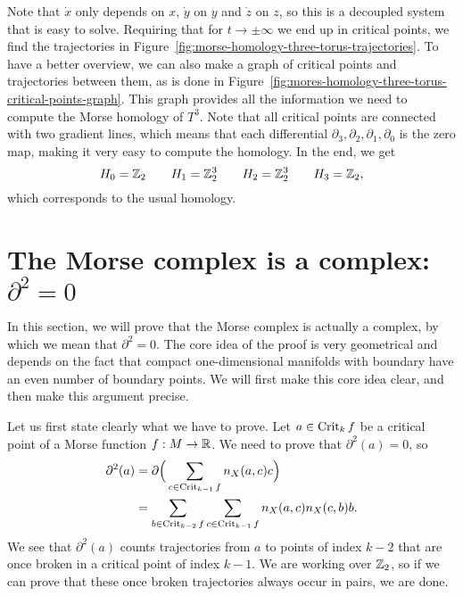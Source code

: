 \begin{eg}
    Note that $\dot x$ only depends on  $x$,  $\dot y$ on  $y$ and  $\dot z$ on $z$, so this is a decoupled system that is easy to solve.
    Requiring that for $t \to  \pm\infty$ we end up in critical points, we find the trajectories in Figure~\ref{fig:morse-homology-three-torus-trajectories}.
    To have a better overview, we can also make a graph of critical points and trajectories between them, as is done in Figure~\ref{fig:mores-homology-three-torus-critical-points-graph}.
    This graph provides all the information we need to compute the Morse homology of $T^{3}$.
    Note that all critical points are connected with two gradient lines, which means that each differential $\partial_3, \partial_{2}, \partial_1, \partial_0$ is the zero map, making it very easy to compute the homology. In the end, we get
    \[
    H_0 = \mathbb{Z}_2 \qquad 
    H_1 = \mathbb{Z}_2^3 \qquad 
    H_2 = \mathbb{Z}_2^3 \qquad 
    H_3 = \mathbb{Z}_2
    ,\] 
    which corresponds to the usual homology.
\end{eg}

\section{The Morse complex is a complex: $\partial^2 = 0$}
In this section, we will prove that the Morse complex is actually a complex, by which we mean that $\partial^2 = 0$.
The core idea of the proof is very geometrical and depends on the fact that compact one-dimensional manifolds with boundary have an even number of boundary points.
We will first make this core idea clear, and then make this argument precise.

Let us first state clearly what we have to prove. Let $a \in \operatorname{Crit}_k f$ be a critical point of a Morse function $f: M \to  \mathbb{R}$.
We need to prove that $\partial^2(a) = 0$, so\begin{align*}
    \partial^2(a) &= \partial \Big(\sum_{c \in \operatorname{Crit}_{k-1} f} n_X(a, c) c\Big)\\
                  &= \sum_{b \in \operatorname{Crit}_{k-2} f} \sum_{c \in \operatorname{Crit}_{k-1} f} n_X(a, c) n_X(c, b) b
.\end{align*} 
We see that $\partial^2(a)$ counts trajectories from $a$ to points of index $k-2$ that are once broken in a critical point of index $k-1$.
We are working over $\mathbb{Z}_2$, so if we can prove that these once broken trajectories always occur in pairs, we are done.

